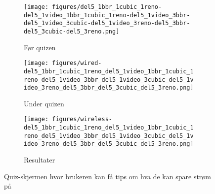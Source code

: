 \begin{figure}
  \centering
  \begin{subfigure}{0.3\textwidth}
    \centering
    \texttt{[image: figures/del5\_1bbr\_1cubic\_1reno-del5\_1video\_1bbr\_1cubic\_1reno-del5\_1video\_3bbr-del5\_1video\_3cubic-del5\_1video\_3reno-del5\_3bbr-del5\_3cubic-del5\_3reno.png]}
    \caption{\label{subfig:før-quiz}Før quizen}
  \end{subfigure}%
  \hfill
  \begin{subfigure}{0.3\textwidth}
    \centering
    \texttt{[image: figures/wired-del5\_1bbr\_1cubic\_1reno\_del5\_1video\_1bbr\_1cubic\_1reno\_del5\_1video\_3bbr\_del5\_1video\_3cubic\_del5\_1video\_3reno\_del5\_3bbr\_del5\_3cubic\_del5\_3reno.png]}
    \caption{\label{subfig:under-quiz}Under quizen}
  \end{subfigure}%
  \hfill
  \begin{subfigure}{0.3\textwidth}
    \centering
    \texttt{[image: figures/wireless-del5\_1bbr\_1cubic\_1reno\_del5\_1video\_1bbr\_1cubic\_1reno\_del5\_1video\_3bbr\_del5\_1video\_3cubic\_del5\_1video\_3reno\_del5\_3bbr\_del5\_3cubic\_del5\_3reno.png]}
    \caption{\label{subfig:etter-quiz}Resultater}
  \end{subfigure}
  \caption{\label{fig:quiz-skjerm}Quiz-skjermen hvor brukeren kan få tips om hva de kan spare strøm på}
\end{figure}
